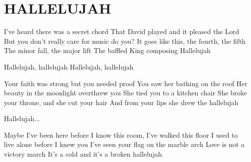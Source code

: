 \documentclass[../../../songbook.tex]{subfiles}
\begin{document}
\TabPositions{8cm} %
\section*{HALLELUJAH}
{}
\vspace{0.5cm}
{\footnotesize
I’ve heard there was a secret chord		 \newline
That David played and it pleased the Lord	 \newline
But you don’t really care for music do you?	 \newline
It goes like this, the fourth, the fifth		 \newline
The minor fall, the major lift			 \newline
The baffled King composing Hallelujah		 \newline

\-\hspace{1cm} Hallelujah, hallelujah	 \newline
\-\hspace{1cm} Hallelujah, hallelujah	 \newline
 
Your faith was strong but you needed proof  \newline
You saw her bathing on the roof  \newline
Her beauty in the moonlight overthrew you  \newline
She tied you to a kitchen chair  \newline
She broke your throne, and she cut your hair  \newline
And from your lips she drew the hallelujah  \newline

\-\hspace{1cm} Hallelujah... \newline
 
Maybe I’ve been here before  \newline
I know this room, I’ve walked this floor  \newline
I used to live alone before I knew you  \newline
I’ve seen your flag on the marble arch  \newline
Love is not a victory march  \newline
It’s a cold and it’s a broken hallelujah  \newline

}
\end{document}
